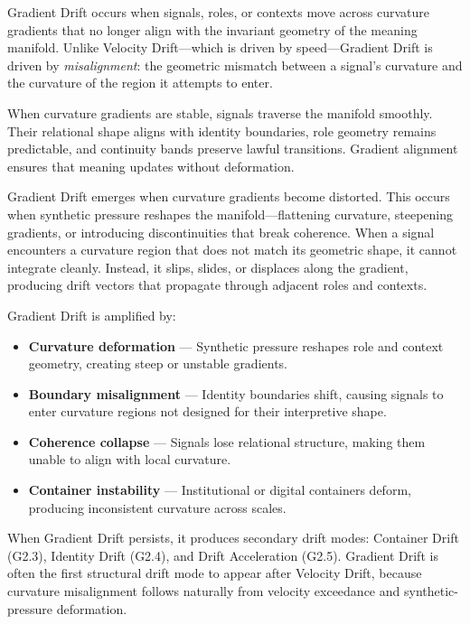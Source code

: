\noindent Gradient Drift occurs when signals, roles, or contexts move across
curvature gradients that no longer align with the invariant geometry of the
meaning manifold. Unlike Velocity Drift—which is driven by speed—Gradient Drift
is driven by \textit{misalignment}: the geometric mismatch between a signal’s
curvature and the curvature of the region it attempts to enter.

\medskip

\noindent When curvature gradients are stable, signals traverse the manifold
smoothly. Their relational shape aligns with identity boundaries, role geometry
remains predictable, and continuity bands preserve lawful transitions. Gradient
alignment ensures that meaning updates without deformation.

\medskip

\noindent Gradient Drift emerges when curvature gradients become distorted. This
occurs when synthetic pressure reshapes the manifold—flattening curvature,
steepening gradients, or introducing discontinuities that break coherence. When
a signal encounters a curvature region that does not match its geometric shape,
it cannot integrate cleanly. Instead, it slips, slides, or displaces along the
gradient, producing drift vectors that propagate through adjacent roles and
contexts.

\medskip

\noindent Gradient Drift is amplified by:

\begin{itemize}[leftmargin=1.2cm]
    \item \textbf{Curvature deformation} — Synthetic pressure reshapes role and
    context geometry, creating steep or unstable gradients.

    \item \textbf{Boundary misalignment} — Identity boundaries shift, causing
    signals to enter curvature regions not designed for their interpretive
    shape.

    \item \textbf{Coherence collapse} — Signals lose relational structure,
    making them unable to align with local curvature.

    \item \textbf{Container instability} — Institutional or digital containers
    deform, producing inconsistent curvature across scales.
\end{itemize}

\medskip

\noindent When Gradient Drift persists, it produces secondary drift modes:
Container Drift (G2.3), Identity Drift (G2.4), and Drift Acceleration (G2.5).
Gradient Drift is often the first structural drift mode to appear after Velocity
Drift, because curvature misalignment follows naturally from velocity exceedance
and synthetic-pressure deformation.

